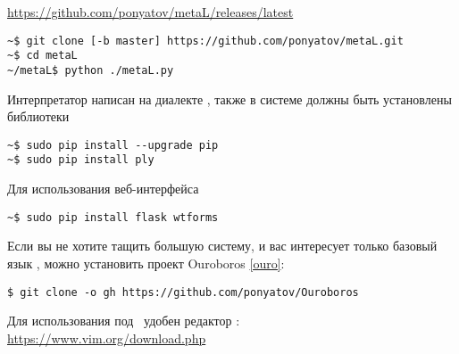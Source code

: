 \label{install}

\url{https://github.com/ponyatov/metaL/releases/latest}

\begin{verbatim}
~$ git clone [-b master] https://github.com/ponyatov/metaL.git
~$ cd metaL
~/metaL$ python ./metaL.py
\end{verbatim}

Интерпретатор написан на диалекте , также в системе должны быть установлены
библиотеки

\begin{verbatim}
~$ sudo pip install --upgrade pip
~$ sudo pip install ply
\end{verbatim}

Для использования веб-интерфейса

\begin{verbatim}
~$ sudo pip install flask wtforms
\end{verbatim}

\clearpage
Если вы не хотите тащить большую систему, и вас интересует только базовый язык
\metal, можно установить проект Ouroboros \ref{ouro}:\ 

\begin{verbatim}
$ git clone -o gh https://github.com/ponyatov/Ouroboros
\end{verbatim}

Для использования под \win\ удобен редактор \vim:\\
\url{https://www.vim.org/download.php}
